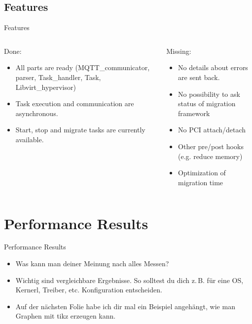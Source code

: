 \documentclass[10pt, aspectratio=1610]{beamer}
\begin{document}
\subsection{Features}
\begin{frame}{Features}
	\begin{columns}[T]
		\begin{column}{.40\textwidth}
			Done:
			\begin{itemize}
				\item All parts are ready (MQTT\_communicator, parser, Task\_handler, Task, Libvirt\_hypervisor)
				\item Task execution and communication are asynchronous.
				\item Start, stop and migrate tasks are currently available.
			\end{itemize}
		\end{column}
		\begin{column}{.40\textwidth}
		Missing:
		\begin{itemize}
			\item No details about errors are sent back.
			\item No possibility to ask status of migration framework
			\item No PCI attach/detach
			\item Other pre/post hooks (e.g. reduce memory)
			\item Optimization of migration time
		\end{itemize}
		\end{column}
	\end{columns}
\end{frame}

\section{Performance Results}
\migrationTime
\begin{frame}{Performance Results}
	\begin{itemize}
		\item Was kann man deiner Meinung nach alles Messen?
		\item Wichtig sind vergleichbare Ergebnisse.
			So solltest du dich z.\,B. für eine OS, Kernerl, Treiber, etc. Konfiguration entscheiden.
		\item Auf der nächsten Folie habe ich dir mal ein Beispiel angehängt, wie man Graphen mit tikz erzeugen kann.
	\end{itemize}
\end{frame}
\end{document}

